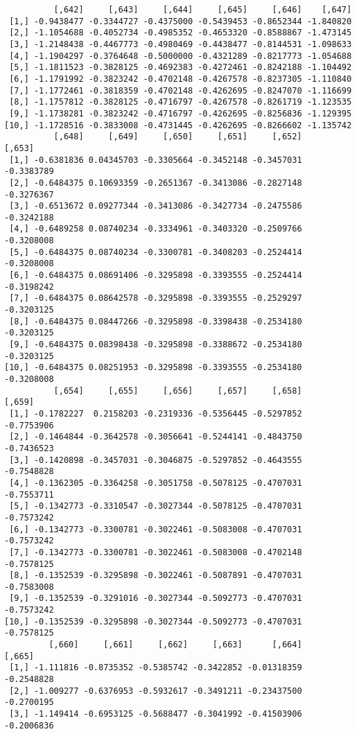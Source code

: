 \documentclass[
  letterpaper,
  DIV=11,
  numbers=noendperiod]{scrreprt}
\begin{document}
\begin{verbatim}
          [,642]     [,643]     [,644]     [,645]     [,646]    [,647]
 [1,] -0.9438477 -0.3344727 -0.4375000 -0.5439453 -0.8652344 -1.840820
 [2,] -1.1054688 -0.4052734 -0.4985352 -0.4653320 -0.8588867 -1.473145
 [3,] -1.2148438 -0.4467773 -0.4980469 -0.4438477 -0.8144531 -1.098633
 [4,] -1.1904297 -0.3764648 -0.5000000 -0.4321289 -0.8217773 -1.054688
 [5,] -1.1811523 -0.3828125 -0.4692383 -0.4272461 -0.8242188 -1.104492
 [6,] -1.1791992 -0.3823242 -0.4702148 -0.4267578 -0.8237305 -1.110840
 [7,] -1.1772461 -0.3818359 -0.4702148 -0.4262695 -0.8247070 -1.116699
 [8,] -1.1757812 -0.3828125 -0.4716797 -0.4267578 -0.8261719 -1.123535
 [9,] -1.1738281 -0.3823242 -0.4716797 -0.4262695 -0.8256836 -1.129395
[10,] -1.1728516 -0.3833008 -0.4731445 -0.4262695 -0.8266602 -1.135742
          [,648]     [,649]     [,650]     [,651]     [,652]     [,653]
 [1,] -0.6381836 0.04345703 -0.3305664 -0.3452148 -0.3457031 -0.3383789
 [2,] -0.6484375 0.10693359 -0.2651367 -0.3413086 -0.2827148 -0.3276367
 [3,] -0.6513672 0.09277344 -0.3413086 -0.3427734 -0.2475586 -0.3242188
 [4,] -0.6489258 0.08740234 -0.3334961 -0.3403320 -0.2509766 -0.3208008
 [5,] -0.6484375 0.08740234 -0.3300781 -0.3408203 -0.2524414 -0.3208008
 [6,] -0.6484375 0.08691406 -0.3295898 -0.3393555 -0.2524414 -0.3198242
 [7,] -0.6484375 0.08642578 -0.3295898 -0.3393555 -0.2529297 -0.3203125
 [8,] -0.6484375 0.08447266 -0.3295898 -0.3398438 -0.2534180 -0.3203125
 [9,] -0.6484375 0.08398438 -0.3295898 -0.3388672 -0.2534180 -0.3203125
[10,] -0.6484375 0.08251953 -0.3295898 -0.3393555 -0.2534180 -0.3208008
          [,654]     [,655]     [,656]     [,657]     [,658]     [,659]
 [1,] -0.1782227  0.2158203 -0.2319336 -0.5356445 -0.5297852 -0.7753906
 [2,] -0.1464844 -0.3642578 -0.3056641 -0.5244141 -0.4843750 -0.7436523
 [3,] -0.1420898 -0.3457031 -0.3046875 -0.5297852 -0.4643555 -0.7548828
 [4,] -0.1362305 -0.3364258 -0.3051758 -0.5078125 -0.4707031 -0.7553711
 [5,] -0.1342773 -0.3310547 -0.3027344 -0.5078125 -0.4707031 -0.7573242
 [6,] -0.1342773 -0.3300781 -0.3022461 -0.5083008 -0.4707031 -0.7573242
 [7,] -0.1342773 -0.3300781 -0.3022461 -0.5083008 -0.4702148 -0.7578125
 [8,] -0.1352539 -0.3295898 -0.3022461 -0.5087891 -0.4707031 -0.7583008
 [9,] -0.1352539 -0.3291016 -0.3027344 -0.5092773 -0.4707031 -0.7573242
[10,] -0.1352539 -0.3295898 -0.3027344 -0.5092773 -0.4707031 -0.7578125
         [,660]     [,661]     [,662]     [,663]      [,664]     [,665]
 [1,] -1.111816 -0.8735352 -0.5385742 -0.3422852 -0.01318359 -0.2548828
 [2,] -1.009277 -0.6376953 -0.5932617 -0.3491211 -0.23437500 -0.2700195
 [3,] -1.149414 -0.6953125 -0.5688477 -0.3041992 -0.41503906 -0.2006836

\end{verbatim}
\end{document}
